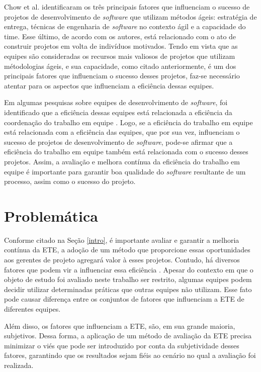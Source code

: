 Chow et al. \cite{chow} identificaram os três principais fatores que influenciam o sucesso de projetos de desenvolvimento de \textit{software} que utilizam métodos ágeis: estratégia de entrega, técnicas de engenharia de \textit{software} no contexto ágil e a capacidade do time. Esse último, de acordo com os autores, está relacionado com o ato de construir projetos em volta de indivíduos motivados. Tendo em vista que as equipes são consideradas os recursos mais valiosos de projetos que utilizam métodologias ágeis, e sua capacidade, como citado anteriormente, é um dos principais fatores que influenciam o sucesso desses projetos, faz-se necessário atentar para os aspectos que influenciam a eficiência dessas equipes.

Em algumas pesquisas sobre equipes de desenvolvimento de \textit{software}, foi identificado que a eficiência dessas equipes está relacionada a eficiência da coordenação do trabalho em equipe \cite{kraut} \cite{hoegl}. Logo, se a eficiência do trabalho em equipe está relacionada com a eficiência das equipes, que por sua vez, influenciam o sucesso de projetos de desenvolvimento de \textit{software}, pode-se afirmar que a eficiência do trabalho em equipe também está relacionada com o sucesso desses projetos. Assim, a avaliação e melhora contínua da eficiência do trabalho em equipe é importante para garantir boa qualidade do \textit{software} resultante de um processo, assim como o sucesso do projeto.

\section{Problemática}
\label{intro:prob}

Conforme citado na Seção \ref{intro}, é importante avaliar e garantir a melhoria contínua da ETE, a adoção de um método que proporcione essas oportunidades aos gerentes de projeto agregará valor à esses projetos. Contudo, há diversos fatores que podem vir a influenciar essa eficiência \cite{}. Apesar do contexto em que o objeto de estudo foi avaliado neste trabalho ser restrito, algumas equipes podem decidir utilizar determinadas práticas que outras equipes não utilizam. Esse fato pode causar diferença entre os conjuntos de fatores que influenciam a ETE de diferentes equipes.

Além disso, os fatores que influenciam a ETE, são, em sua grande maioria, subjetivos. Dessa forma, a aplicação de um método de avaliação da ETE precisa minimizar o viés que pode ser introduzido por conta da subjetividade desses fatores, garantindo que os resultados sejam fiéis ao cenário no qual a avaliação foi realizada.

